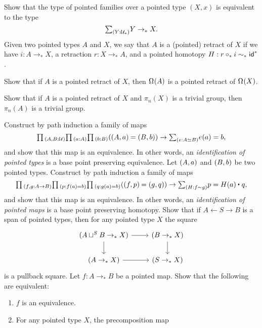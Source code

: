 \begin{exercises}
\exercise Show that the type of pointed families over a pointed type $(X,x)$ is equivalent to the type
\begin{equation*}
\sm{Y:\UU_\ast} Y\to_\ast X.
\end{equation*}
\exercise Given two pointed types $A$ and $X$, we say that $A$ is a (pointed) retract of $X$ if we have $i:A\to_\ast X$, a retraction $r:X\to_\ast A$, and a pointed homotopy $H:r\circ_\ast i\sim_\ast \mathsf{id}_{}^\ast$. 
\begin{subexenum}
\item Show that if $A$ is a pointed retract of $X$, then $\Omega^{}(A)$ is a pointed retract of $\Omega^{}(X)$. 
\item Show that if $A$ is a pointed retract of $X$ and $\pi_n(X)$ is a trivial group, then $\pi_n(A)$ is a trivial group.
\end{subexenum}
\exercise Construct by path induction a family of maps
\begin{equation*}
\prd{A,B:\UU}{a:A}{b:B} (\id{\pairr{A,a}}{\pairr{B,b}})\to \sm{e:\eqv{A}{B}}e(a)=b,
\end{equation*}
and show that this map is an equivalence. In other words, an \emph{identification of pointed types} is a base point preserving equivalence.
\exercise Let ${\mathopen{}(A,a)\mathclose{}}$ and ${\mathopen{}(B,b)\mathclose{}}$ be two pointed types. Construct by path induction a family of maps
\begin{equation*}
\prd{f,g:A\to B}{p:f(a)=b}{q:g(a)=b} (\id{\pairr{f,p}}{\pairr{g,q}})\to \sm{H:f\htpy g} p = \ct{H(a)}{q},
\end{equation*}
and show that this map is an equivalence. In other words, an \emph{identification of pointed maps} is a base point preserving homotopy.
\exercise Show that if $A\leftarrow S\rightarrow B$ is a span of pointed types, then for any pointed type $X$ the square
\begin{equation*}
\begin{tikzcd}
(A\sqcup^S B \to_\ast X) \arrow[r] \arrow[d] & (B \to_\ast X) \arrow[d] \\
(A\to_\ast X) \arrow[r] & (S\to_\ast X)
\end{tikzcd}
\end{equation*}
is a pullback square.
\exercise \label{ex:yoneda_ptd_types}Let $f:A\to_\ast B$ be a pointed map. Show that the following are equivalent:
\begin{enumerate}
\item $f$ is an equivalence.
\item For any pointed type $X$, the precomposition map

\end{enumerate}
\end{exercises}
